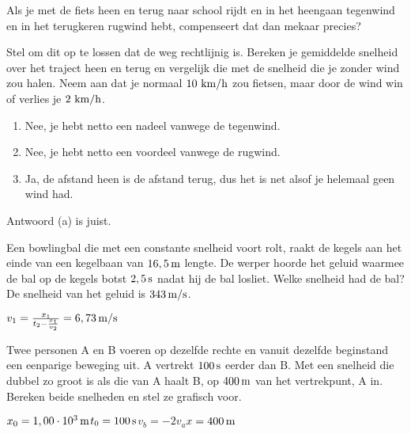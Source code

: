 \begin{exercise} Als je met de fiets heen en terug naar school rijdt en in het heengaan tegenwind en in het terugkeren rugwind hebt, compenseert dat dan mekaar precies?

Stel om dit op te lossen dat de weg rechtlijnig is. Bereken je gemiddelde snelheid over het traject heen en terug en vergelijk die met de snelheid die je zonder wind zou halen. Neem aan dat je normaal $10~\rm km/h$ zou fietsen, maar door de wind win of verlies je $2~\rm km/h$.
\begin{enumerate}
\item Nee, je hebt netto een nadeel vanwege de tegenwind.
\item Nee, je hebt netto een voordeel vanwege de rugwind.
\item Ja, de afstand heen is de afstand terug, dus het is net alsof je helemaal geen wind had.
\end{enumerate}
\begin{oplossing}
Antwoord (a) is juist.
\end{oplossing}

\end{exercise}

\begin{exercise} Een bowlingbal die met een constante snelheid voort rolt, raakt de kegels aan het einde van een kegelbaan van $16,5\rm\,m$ lengte. De werper hoorde het geluid waarmee de bal op de kegels botst $2,5\rm\,s$ nadat hij de bal losliet. Welke snelheid had de bal? De snelheid van het geluid is $343\rm\,m/s$. 
\begin{oplossing}
$v_1=\frac{x_1}{t_2-\frac{x_1}{v_2}}=6,73\rm\,m/s$
\end{oplossing}

\end{exercise}

\begin{exercise} Twee personen A en B voeren op dezelfde rechte en vanuit dezelfde beginstand een eenparige beweging uit. A vertrekt $100\rm\,s$ eerder dan B. Met een snelheid die dubbel zo groot is als die van A haalt B, op $400\rm\,m$ van het vertrekpunt, A in. Bereken beide snelheden en stel ze grafisch voor.
\end{exercise}

\begin{exercise}[gegeven]$x_0=1,00\cdot10^3\rm\,m$\newline$t_0=100\rm\,s$\newline$v_b=-2v_a$\newline$x=400\rm\,m$
\end{exercise}

